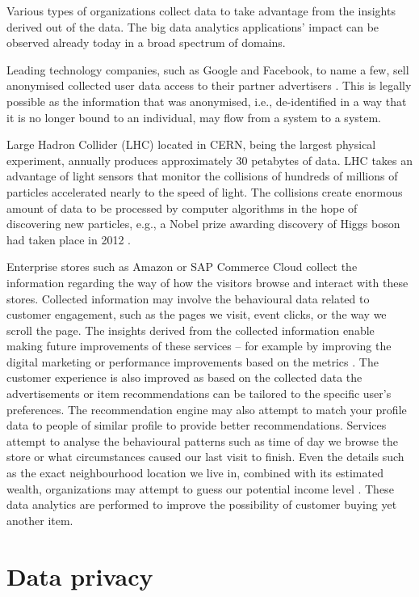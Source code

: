 \documentclass[a4paper,twoside,12pt]{book}
\begin{document}
Various types of organizations collect data to take advantage from the insights derived out of the data. The big data analytics applications' impact can be observed already today in a broad spectrum of domains. 

Leading technology companies, such as Google and Facebook, to name a few, sell anonymised collected user data access to their partner advertisers \cite{bib:big_data_in_practice}. This is legally possible as the information that was anonymised, i.e., de-identified in a way that it is no longer bound to an individual, may flow from a system to a system.

Large Hadron Collider (LHC) located in CERN, being the largest physical experiment, annually produces approximately 30 petabytes of data. LHC takes an advantage of light sensors that monitor the collisions of hundreds of millions of particles accelerated nearly to the speed of light. The collisions create enormous amount of data to be processed by computer algorithms in the hope of discovering new particles, e.g., a Nobel prize awarding discovery of Higgs boson had taken place in 2012 \cite{bib:cern}.

Enterprise stores such as Amazon or SAP Commerce Cloud collect the information regarding the way of how the visitors browse and interact with these stores. Collected information may involve the behavioural data related to customer engagement, such as the pages we visit, event clicks, or the way we scroll the page. The insights derived from the collected information enable making future improvements of these services – for example by improving the digital marketing or performance improvements based on the metrics \cite{bib:sap}. The customer experience is also improved as based on the collected data the advertisements or item recommendations can be tailored to the specific user's preferences. The recommendation engine may also attempt to match your profile data to people of similar profile to provide better recommendations. Services attempt to analyse the behavioural patterns such as time of day we browse the store or what circumstances caused our last visit to finish. Even the details such as the exact neighbourhood location we live in, combined with its estimated wealth, organizations may attempt to guess our potential income level \cite{bib:big_data_in_practice}. These data analytics are performed to improve the possibility of customer buying yet another item.

\section{Data privacy}
\end{document}
